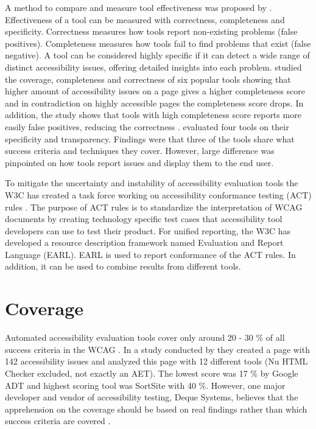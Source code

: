 A method to compare and measure tool effectiveness was proposed by \cite{Brajnik2004}. Effectiveness of a tool can be measured with correctness, completeness and specificity. Correctness measures how tools report non-existing problems (false positives). Completeness measures how tools fail to find problems that exist (false negative). A tool can be considered highly specific if it can detect a wide range of distinct accessibility issues, offering detailed insights into each problem. \cite{benchmark_aet} studied the coverage, completeness and correctness of six popular tools showing that higher amount of accessibility issues on a page gives a higher completeness score and in contradiction on highly accessible pages the completeness score drops. In addition, the study shows that tools with high completeness score reports more easily false positives, reducing the correctness \citep{benchmark_aet}. \cite{tooltransparency} evaluated four tools on their specificity and transparency. Findings were that three of the tools share what success criteria and techniques they cover. However, large difference was pinpointed on how tools report issues and display them to the end user.

To mitigate the uncertainty and instability of accessibility evaluation tools the W3C has created a task force working on accessibility conformance testing (ACT) rules \citep{act_overview}. The purpose of ACT rules is to standardize the interpretation of WCAG documents by creating technology specific test cases that accessibility tool developers can use to test their product. For unified reporting, the W3C has developed a resource description framework named Evaluation and Report Language (EARL). EARL is used to report conformance of the ACT rules. In addition, it can be used to combine results from different tools.

\section{Coverage}

Automated accessibility evaluation tools cover only around 20 - 30 \% of all success criteria in the WCAG \citep{govukaccessibilityresults, webaimmillions, dequecoverage}. In a study conducted by \cite{govukaccessibilityresults} they created a page with 142 accessibility issues and analyzed this page with 12 different tools (Nu HTML Checker excluded, not exactly an AET). The lowest score was 17 \% by Google ADT and highest scoring tool was SortSite with 40 \%. However, one major developer and vendor of accessibility testing, Deque Systems, believes that the apprehension on the coverage should be based on real findings rather than which success criteria are covered \citep{dequecoverage}. 

